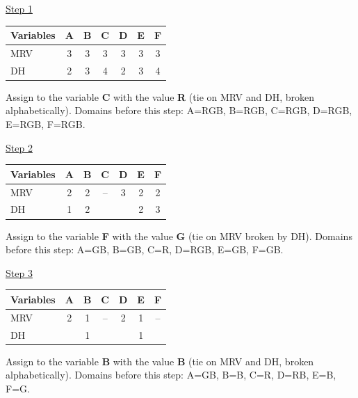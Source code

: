 \documentclass[11pt,a4paper]{article}
\begin{document}
\begin{solbox}
\par \underline{Step 1}\par\begin{center}\small \begin{tabular}{|l|c|c|c|c|c|c|}\hline Variables & \textbf{A} & \textbf{B} & \textbf{C} & \textbf{D} & \textbf{E} & \textbf{F}\\ \hline MRV & \textcolor{blue!60!black}{3} & \textcolor{blue!60!black}{3} & \textcolor{blue!60!black}{3} & \textcolor{blue!60!black}{3} & \textcolor{blue!60!black}{3} & \textcolor{blue!60!black}{3}\\ \hline DH & \textcolor{blue!60!black}{2} & \textcolor{blue!60!black}{3} & \textcolor{blue!60!black}{4} & \textcolor{blue!60!black}{2} & \textcolor{blue!60!black}{3} & \textcolor{blue!60!black}{4}\\ \hline\end{tabular}\end{center}Assign to the variable \textbf{C} with the value \textbf{R} (tie on MRV and DH, broken alphabetically). Domains before this step: A=RGB, B=RGB, C=RGB, D=RGB, E=RGB, F=RGB.\par
\underline{Step 2}\par\begin{center}\small \begin{tabular}{|l|c|c|c|c|c|c|}\hline Variables & \textbf{A} & \textbf{B} & \textbf{C} & \textbf{D} & \textbf{E} & \textbf{F}\\ \hline MRV & \textcolor{blue!60!black}{2} & \textcolor{blue!60!black}{2} & -- & \textcolor{blue!60!black}{3} & \textcolor{blue!60!black}{2} & \textcolor{blue!60!black}{2}\\ \hline DH & \textcolor{blue!60!black}{1} & \textcolor{blue!60!black}{2} &  &  & \textcolor{blue!60!black}{2} & \textcolor{blue!60!black}{3}\\ \hline\end{tabular}\end{center}Assign to the variable \textbf{F} with the value \textbf{G} (tie on MRV broken by DH). Domains before this step: A=GB, B=GB, C=R, D=RGB, E=GB, F=GB.\par
\underline{Step 3}\par\begin{center}\small \begin{tabular}{|l|c|c|c|c|c|c|}\hline Variables & \textbf{A} & \textbf{B} & \textbf{C} & \textbf{D} & \textbf{E} & \textbf{F}\\ \hline MRV & \textcolor{blue!60!black}{2} & \textcolor{blue!60!black}{1} & -- & \textcolor{blue!60!black}{2} & \textcolor{blue!60!black}{1} & --\\ \hline DH &  & \textcolor{blue!60!black}{1} &  &  & \textcolor{blue!60!black}{1} & \\ \hline\end{tabular}\end{center}Assign to the variable \textbf{B} with the value \textbf{B} (tie on MRV and DH, broken alphabetically). Domains before this step: A=GB, B=B, C=R, D=RB, E=B, F=G.\par

\end{solbox}
\end{document}
